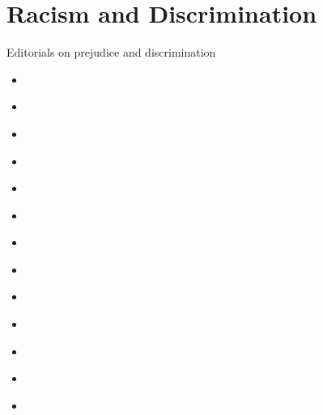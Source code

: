 \documentclass[letterpaper,10pt,english]{jupyterBook}
\begin{document}
\chapter{Racism and Discrimination}
\label{\detokenize{Sections/racism:racism-and-discrimination}}\label{\detokenize{Sections/racism::doc}}
\sphinxAtStartPar
Editorials on prejudice and discrimination
\begin{itemize}
\item {} 
\sphinxAtStartPar
{\hyperref[\detokenize{Volumes/01/03/social_equality::doc}]{}}

\item {} 
\sphinxAtStartPar
{\hyperref[\detokenize{Volumes/01/03/ashamed::doc}]{}}

\item {} 
\sphinxAtStartPar
{\hyperref[\detokenize{Volumes/03/04/light::doc}]{}}

\item {} 
\sphinxAtStartPar
{\hyperref[\detokenize{Volumes/06/02/logic::doc}]{}}

\item {} 
\sphinxAtStartPar
{\hyperref[\detokenize{Volumes/10/01/clansman::doc}]{}}

\item {} 
\sphinxAtStartPar
{\hyperref[\detokenize{Volumes/12/05/conduct_not_color::doc}]{}}

\item {} 
\sphinxAtStartPar
{\hyperref[\detokenize{Volumes/12/06/migration::doc}]{}}

\item {} 
\sphinxAtStartPar
{\hyperref[\detokenize{Volumes/19/01/social_equality::doc}]{}}

\item {} 
\sphinxAtStartPar
{\hyperref[\detokenize{Volumes/24/01/slavery::doc}]{}}

\item {} 
\sphinxAtStartPar
{\hyperref[\detokenize{Volumes/31/04/newer_south::doc}]{}}

\item {} 
\sphinxAtStartPar
{\hyperref[\detokenize{Volumes/34/02/higher_friction::doc}]{}}

\item {} 
\sphinxAtStartPar
{\hyperref[\detokenize{Volumes/34/09/prejudice::doc}]{}}

\item {} 
\sphinxAtStartPar
{\hyperref[\detokenize{Volumes/37/02/about_wailing::doc}]{}}

\end{itemize}
\end{document}
